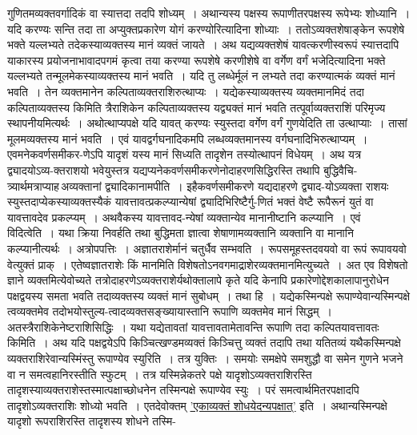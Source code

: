 \documentclass[11pt, openany]{book}
\begin{document}
\newpage

\begin{sloppypar}
\noindent गुणितमव्यक्तवर्गादिकं वा स्यात्तदा तदपि शोध्यम्~। अथान्यस्य पक्षस्य रूपाणीतरपक्षस्य रूपेभ्यः शोध्यानि~। यदि करण्यः सन्ति तदा ता अप्युक्तप्रकारेण योगं करण्योरित्यादिना शोध्याः~। ततोऽव्यक्तशेषाङ्केन रूपशेषे भक्ते यल्लभ्यते तदेकस्याव्यक्तस्य मानं व्यक्तं जायते~। अथ यद्यव्यक्तशेषं यावत्करणीस्वरूपं स्यात्तदापि याकारस्य प्रयोजनाभावादपगमं कृत्वा तया करण्या रूपशेषे करणीशेषे वा वर्गेण वर्गं भजेदित्यादिना भक्ते यल्लभ्यते तन्मूलमेकस्याव्यक्तस्य मानं भवति~। यदि तु लब्धेर्मूलं न लभ्यते तदा करण्यात्मकं व्यक्तं मानं भवति~। तेन व्यक्तमानेन कल्पिताव्यक्तराशिरुत्थाप्यः~। यद्येकस्याव्यक्तस्य व्यक्तमानमिदं तदा कल्पिताव्यक्तस्य किमिति त्रैराशिकेन कल्पिताव्यक्तस्य यद्व्यक्तं मानं भवति तत्पूर्वाव्यक्तराशिं परिमृज्य स्थापनीयमित्यर्थः~। अथोत्थाप्यपक्षे यदि यावत् करण्यः स्युस्तदा वर्गेण वर्गं गुणयेदिति ता उत्थाप्याः~। तासां मूलमव्यक्तस्य मानं भवति~। एवं यावद्वर्गघनादिकमपि लब्धव्यक्तमानस्य वर्गघनादिभिरुत्थाप्यम्~। एवमनेकवर्णसमीकर-णेऽपि यादृशं यस्य मानं सिध्यति तादृशेन तस्योत्थापनं विधेयम्~। अथ यत्र द्व्यादयोऽव्य-क्तराशयो भवेयुस्तत्र यद्यप्यनेकवर्णसमीकरणेनोदाहरणसिद्धिरस्ति तथापि बुद्धिवैचि-त्र्यार्थमत्राप्याह\textendash \,अव्यक्तानां द्व्यादिकानामपीति~। इहैकवर्णसमीकरणे यद्यदाहरणे द्व्याद-योऽव्यक्ता राशयः स्युस्तदाप्येकस्याव्यक्तस्यैकं यावत्तावत्प्रकल्प्यान्येषां द्व्यादिभिरिष्टैर्गु-णितं भक्तं वेष्टै रूपैरूनं युतं वा यावत्तावदेव प्रकल्प्यम्~। अथवैकस्य यावत्तावद-न्येषां व्यक्तान्येव मानानीष्टानि कल्प्यानि~। एवं विदित्वेति~। यथा क्रिया निवर्हति तथा बुद्धिमता ज्ञात्वा शेषाणामव्यक्तानि व्यक्तानि वा मानानि कल्प्यानीत्यर्थः~। अत्रोपपत्तिः~। अज्ञातराशेर्मानं चतुर्धैव सम्भवति~। रूपसमूहस्तदवयवो वा रूपं रूपावयवो वेत्युक्तं प्राक्~। एतेष्वज्ञातराशेः किं मानमिति विशेषतोऽनवगमाद्राशेरव्यक्तमानमित्युच्यते~। अत एव विशेषतो ज्ञाने व्यक्तमित्येवोच्यते तत्रोदाहरणेऽव्यक्तराशेर्यथोक्तालापे कृते यदि केनापि प्रकारेणोद्देशकालापानुरोधेन पक्षद्वयस्य समता भवति तदाव्यक्तस्य व्यक्तं मानं सुबोधम्~। तथा हि~। यद्येकस्मिन्पक्षे रूपाण्येवान्यस्मिन्पक्षे त्वव्यक्तमेव तदोभयोस्तुल्य-त्वादव्यक्तसङ्ख्यायास्तानि रूपाणि व्यक्तमेव मानं सिद्धम्~। अतस्त्रैराशिकेनेष्टराशिसिद्धिः~। यथा यद्येतावतां यावत्तावतामेतावन्ति रूपाणि तदा कल्पितयावत्तावतः किमिति~। अथ यदि पक्षद्वयेऽपि किञ्चित्खण्डमव्यक्तं किञ्चित्तु व्यक्तं तदापि तथा यतितव्यं यथैकस्मिन्पक्षे व्यक्तराशिरेवान्यस्मिंस्तु रूपाण्येव स्युरिति~। तत्र युक्तिः~। समयोः समक्षेपे समशुद्धौ वा समेन गुणने भजने वा न समत्वहानिरस्तीति स्फुटम्~। तत्र यस्मिन्नेकतरे पक्षे यादृशोऽव्यक्तराशिरस्ति तादृशस्याव्यक्तराशेस्तस्मात्पक्षाच्छोधनेन तस्मिन्पक्षे रूपाण्येव स्युः~। परं समत्वार्थमितरपक्षादपि तादृशोऽव्यक्तराशिः शोध्यो भवति~। एतदेवोक्तम् \hyperref[7.89]{'एकाव्यक्तं शोधयेदन्यपक्षात्'} इति~। अथान्यस्मिन्पक्षे यादृशो रूपराशिरस्ति तादृशस्य शोधने तस्मि-
\end{sloppypar}
\end{document}
